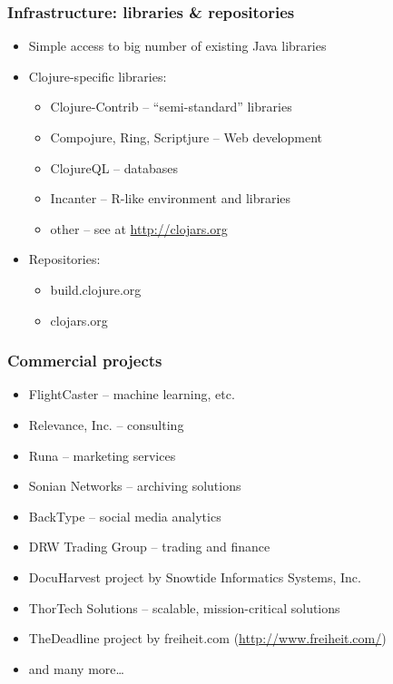 \begin{frame}[t]
  \frametitle{Infrastructure: libraries \& repositories}
  \begin{itemize}
  \item Simple access to big number of existing Java libraries
  \item Clojure-specific libraries:
    \begin{itemize}
    \item Clojure-Contrib -- ``semi-standard'' libraries
    \item Compojure, Ring, Scriptjure -- Web development
    \item ClojureQL -- databases
    \item Incanter -- R-like environment and libraries
    \item other -- see at \url{http://clojars.org}
    \end{itemize}
  \item Repositories:
    \begin{itemize}
    \item build.clojure.org
    \item clojars.org
    \end{itemize}
  \end{itemize}
\end{frame}

\begin{frame}[t]
  \frametitle{Commercial projects}
  \begin{itemize}
    \item FlightCaster -- machine learning, etc.
    \item Relevance, Inc. -- consulting
    \item Runa -- marketing services
    \item Sonian Networks -- archiving solutions
    \item BackType -- social media analytics
    \item DRW Trading Group -- trading and finance
    \item DocuHarvest project by Snowtide Informatics Systems, Inc.
    \item ThorTech Solutions -- scalable, mission-critical solutions
    \item TheDeadline project by freiheit.com (\url{http://www.freiheit.com/})
    \item and many more\ldots{}
  \end{itemize}
\end{frame}

